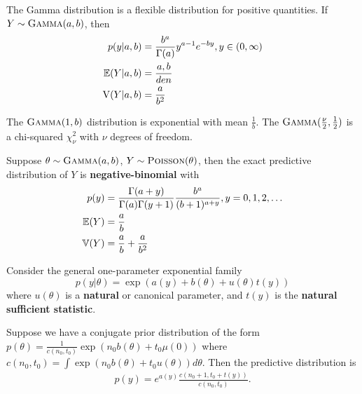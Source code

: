 \begin{defn}
  \label{sec:prob-bayes-theor-8}
  The Gamma distribution is a flexible distribution for positive
  quantities.  If $Y \sim \textsc{Gamma}(a, b)$, then
  \begin{align}
    \label{eq:6}
    p(y|a,b) &= \frac{b^{a}}{\Gamma(a)} y^{a-1} e^{-by}, y \in (0,
    \infty) \\
    \E{Y|a, b} &= \frac{a, b}{den} \\
    \V(Y|a, b) &= \frac{a}{b^{2}}
  \end{align}

  The $\textsc{Gamma}(1, b)$ distribution is exponential with mean
  $\frac{1}{b}$. The $\textsc{Gamma}(\frac{\nu}{2}, \frac{1}{2})$ is a
  chi-squared $\chi^{2}_{\nu}$ with $\nu$ degrees of freedom.
\end{defn}

\begin{thm}
  \label{sec:prob-bayes-theor-9}
  Suppose $\theta \sim \textsc{Gamma}(a, b)$, $Y \sim \textsc{Poisson}(\theta)$, then
  the exact predictive distribution of $Y$ is
  \textbf{negative-binomial} with
  \begin{align}
    \label{eq:8}
    p(y) &= \frac{\Gamma(a+y)}{\Gamma(a) \Gamma(y+1)}
    \frac{b^{a}}{(b+1)^{a+y}}, y= 0, 1, 2, \dots \\
    \E{Y} &= \frac{a}{b} \\
    \Var{Y} &= \frac{a}{b} + \frac{a}{b^{2}}
  \end{align}
\end{thm}

\begin{thm}
  \label{sec:prob-bayes-theor-10}
  Consider the general one-parameter exponential family
  \begin{equation}
    \label{eq:9}
    p(y|\theta) = \exp(a(y) + b(\theta) + u(\theta)t(y))
  \end{equation} where $u(\theta)$ is a \textbf{natural} or canonical
  parameter, and $t(y)$ is the \textbf{natural sufficient statistic}.

  Suppose we have a conjugate prior distribution of the form
  $p(\theta) = \frac{1}{c(n_{0}, t_{0})} \exp(n_{0} b(\theta) + t_{0}
  \mu(0))$ where $c(n_{0}, t_{0}) = \int \exp(n_{0} b(\theta) + t_{0}
  u(\theta)) d\theta$.  Then the predictive distribution is
  \begin{align}
    \label{eq:10}
    p(y) = e^{a(y)} \frac{c(n_{0} + 1, t_{0} + t(y))}{c(n_{0}, t_{0})}.
  \end{align}
\end{thm}


